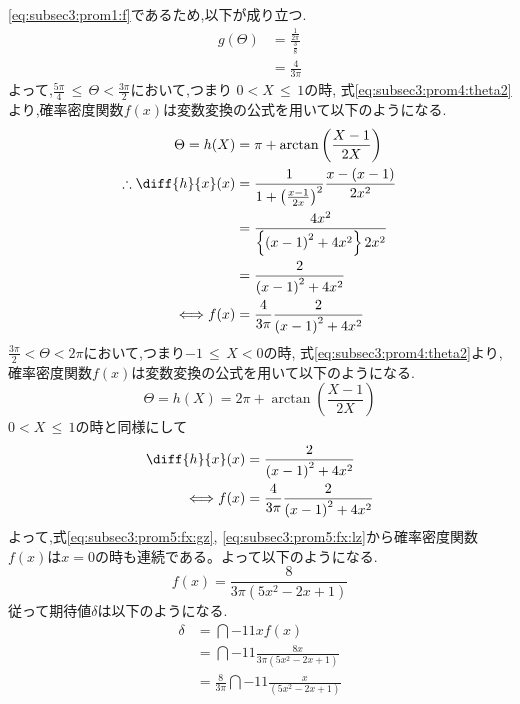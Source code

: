 \documentclass[dvipdfmx,titlepage, 11pt, a4paper]{jsarticle}%
\begin{document}
\begin{enumerate}[(1)]
  \eqref{eq:subsec3:prom1:f}であるため,以下が成り立つ.
  \begin{align*}
    g(\Theta) &= \frac{\frac{1}{2\pi}}{\frac{3}{8}}\\
              &= \frac{4}{3\pi}
  \end{align*}
  よって,$\frac{5\pi}{4}\, \leq\, \Theta < \frac{3\pi}{2}$において,つまり $0 < X\, \leq\, 1$の時,
  式\eqref{eq:subsec3:prom4:theta2}より,確率密度関数$f(x)$は変数変換の公式を用いて以下のようになる.
  \begin{align}
    \Theta = h(X) &= \pi + \arctan\left(\frac{X - 1}{2X}\right) \nonumber\\
    \therefore \diff{h}{x}(x) &= \frac{1}{1 + \left(\frac{x - 1}{2x}\right)^2}\frac{x - (x - 1)}{2x^2}\nonumber\\
                  &= \frac{4x^2}{\left\{\left(x - 1\right)^2 + 4x^2\right\}2x^2}\nonumber\\
                  &= \frac{2}{\left(x - 1\right)^2 + 4x^2}\nonumber\\
    \Longleftrightarrow f(x) &= \frac{4}{3\pi}\frac{2}{\left(x - 1\right)^2 + 4x^2}\label{eq:subsec3:prom5:fx:gz}
  \end{align}
  $\frac{3\pi}{2} < \Theta < 2\pi$において,つまり$-1\, \leq\, X < 0$の時,
  式\eqref{eq:subsec3:prom4:theta2}より,確率密度関数$f(x)$は変数変換の公式を用いて以下のようになる.
  \begin{equation*}
    \Theta = h(X) = 2\pi + \arctan\left(\frac{X - 1}{2X}\right)
  \end{equation*}
  $0 < X\, \leq\, 1$の時と同様にして
  \begin{align}
    \diff{h}{x}(x) &= \frac{2}{\left(x - 1\right)^2 + 4x^2}\nonumber\\
    \Longleftrightarrow f(x) &= \frac{4}{3\pi}\frac{2}{\left(x - 1\right)^2 + 4x^2}\label{eq:subsec3:prom5:fx:lz}
  \end{align}
  よって,式\eqref{eq:subsec3:prom5:fx:gz}, \eqref{eq:subsec3:prom5:fx:lz}から確率密度関数$f(x)$は$x=0$の時も連続である。よって以下のようになる.
  \begin{equation*}
    f(x) = \frac{8}{3\pi(5x^2 - 2x + 1)}
  \end{equation*}
  従って期待値$\delta$は以下のようになる.
  \begin{align*}
    \delta &= \dint{-1}{1}{xf(x)}\\
          &= \dint{-1}{1}{\frac{8x}{3\pi(5x^2 - 2x + 1)}}\\
          &= \frac{8}{3\pi}\dint{-1}{1}{\frac{x}{(5x^2 - 2x + 1)}}\\

\end{align*}
\end{enumerate}
\end{document}
